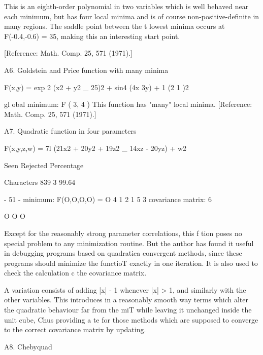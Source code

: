      This is an eighth-order polynomial in two variables which is well
behaved near each minimum, but has four local minima and is of course
non-positive-definite in many regions.  The saddle point between the t
lowest minima occurs at F(-0.4,-0.6) = 35, making this an interesting
start point.
 
[Reference:  Math. Comp. 25, 571 (1971).]
 
 
 
A6. Goldstein and Price function with many minima
 
 
    F(x,y) = exp 2 (x2 + y2 _ 25)2 + sin4 (4x  3y)  +  1  (2     1  )2
 
 
 
gl obal minimum:             F ( 3, 4 )
      This function has "many" local minima.
[Reference:  Math. Comp. 25, 571 (1971).]
 
 
 
A7. Quadratic function in four parameters
 
 
 
        F(x,y,z,w) = 7l (21x2 + 20y2 + 19z2 _ 14xz - 20yz) + w2
 
                 Seen Rejected  Percentage
 
Characters        839        3   99.64
 
                                 - 51 -
minimum:                    F(O,O,O,O) = O
                            4 1 2
                             1 5 3
covariance matrix:                   6
 
 
                                O O O
 
 
 
     Except for the reasonably strong parameter correlations, this f
tion poses no special problem to any minimization routine.  But the
author has found it useful in debugging programs based on quadratica
convergent methods, since these programs should minimize the functioT
exactly in one iteration.  It is also used to check the calculation c
the covariance matrix.
 
     A variation consists of adding |x| - 1 whenever |x| > 1, and
similarly with the other variables.  This introduces in a reasonably
smooth way terms which alter the quadratic behaviour far from the miT
while leaving it unchanged inside the unit cube, Chus providing a te
for those methods which are supposed to converge to the correct
covariance matrix by updating.
 
 
 
A8.  Chebyquad
 
